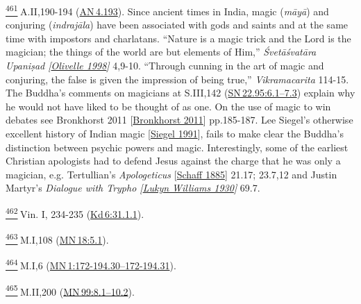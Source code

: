 \label{footprints_split_025.html_fn461}
\hyperref[footprints_split_013.htmlux5cux23fnref461]{\textsuperscript{461}} A.II,190-194
(\href{https://suttacentral.net/an4.193/en/sujato}{AN\,4.193}). Since
ancient times in India, magic (\emph{māyā}) and conjuring
(\emph{indrajāla}) have been associated with gods and saints and at the
same time with impostors and charlatans. ``Nature is a magic trick and
the Lord is the magician; the things of the world are but elements of
Him,'' \emph{{Śvetāśvatāra Upaniṣad
{{[}\hyperref[footprints_split_022.htmlux5cux23Olivelleux5cux25201998]{Olivelle
1998}{]}}}} 4,9-10. ``Through cunning in the art of magic and conjuring,
the false is given the impression of being true,'' \emph{Vikramacarita}
114-15. The Buddha's comments on magicians at S.III,142
(\href{https://suttacentral.net/sn22.95/en/sujato\#6.1}{SN\,22.95:6.1--7.3})
explain why he would not have liked to be thought of as one. On the use
of magic to win debates see {Bronkhorst 2011
{{[}\hyperref[footprints_split_022.htmlux5cux23Bronkhorstux5cux25202011]{Bronkhorst
2011}{]}}} pp.185-187. {Lee Siegel's otherwise excellent history of
Indian magic
{{[}\hyperref[footprints_split_023.htmlux5cux23Siegelux5cux25201991]{Siegel
1991}{]}}}, fails to make clear the Buddha's distinction between psychic
powers and magic. Interestingly, some of the earliest Christian
apologists had to defend Jesus against the charge that he was only a
magician, e.g. {Tertullian's \emph{Apologeticus}
{{[}\hyperref[footprints_split_023.htmlux5cux23Schaffux5cux25201885]{Schaff
1885}{]}}} 21.17; 23.7,12 and Justin Martyr's \emph{{Dialogue with
Trypho
{{[}\hyperref[footprints_split_023.htmlux5cux23Lukynux5cux2520Williamsux5cux25201930]{Lukyn
Williams 1930}{]}}}} 69.7.

\label{footprints_split_025.html_fn462}
\hyperref[footprints_split_013.htmlux5cux23fnref462]{\textsuperscript{462}} Vin.
I, 234-235
(\href{https://suttacentral.net/pli-tv-kd6/en/brahmali\#31.1.1}{Kd\,6:31.1.1}).

\label{footprints_split_025.html_fn463}
\hyperref[footprints_split_013.htmlux5cux23fnref463]{\textsuperscript{463}} M.I,108
(\href{https://suttacentral.net/mn18/en/sujato\#5.1}{MN\,18:5.1}).

\label{footprints_split_025.html_fn464}
\hyperref[footprints_split_013.htmlux5cux23fnref464]{\textsuperscript{464}} M.I,6
(\href{https://suttacentral.net/mn1/en/sujato\#172-194.30}{MN\,1:172-194.30--172-194.31}).

\label{footprints_split_025.html_fn465}
\hyperref[footprints_split_013.htmlux5cux23fnref465]{\textsuperscript{465}} M.II,200
(\href{https://suttacentral.net/mn99/en/sujato\#8.1}{MN\,99:8.1--10.2}).

